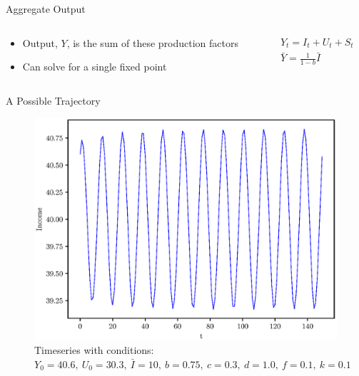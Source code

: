 \documentclass{beamer}
\begin{document}
\begin{frame}{Aggregate Output}
	\begin{columns}
	\begin{column}{0.5\textwidth}
		\begin{itemize}
			\item Output, $Y$, is the sum of these production factors
			\item Can solve for a single fixed point
		\end{itemize}
	\end{column}
	\begin{column}{0.5\textwidth}
		\begin{align*}
			Y_t = I_t + U_t + S_t\\ 
			\bar Y = \frac{1}{1-b}\bar I
		\end{align*}
	\end{column}
	\end{columns}
\end{frame}

\begin{frame}{A Possible Trajectory}
	\begin{figure}
		\centering
		\includegraphics[height=0.7\textheight]{timeseries_income.eps}
		\caption{Timeseries with conditions: $Y_0=40.6,\ U_0=30.3,\ \bar I=10,\ b=0.75,\ c=0.3,\ d=1.0,\ f=0.1,\ k=0.1$}
	\end{figure}
\end{frame}
\end{document}
